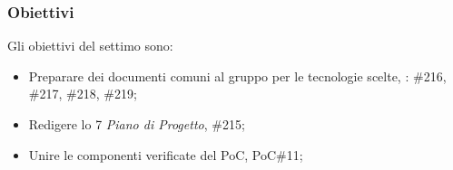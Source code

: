 \subsubsection{Obiettivi}
\label{sec:sprint7_obiettivi}
Gli obiettivi del settimo  sono:
\begin{itemize}
    \item Preparare dei documenti comuni al gruppo per le tecnologie scelte, : \#216, \#217, \#218, \#219;
    \item Redigere lo  7 \textit{Piano di Progetto},  \#215;
    \item Unire le componenti verificate del PoC,  PoC\#11;
\end{itemize}